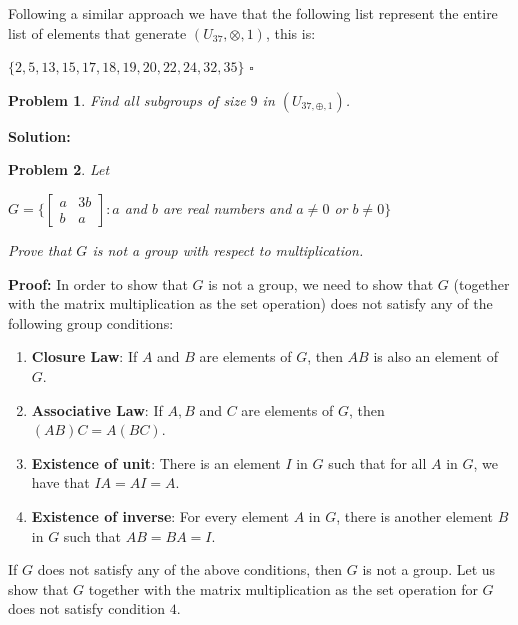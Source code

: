 \documentclass[a4paper,openany,11pt]{book}
\newtheorem{Prob}{Problem}
\begin{document}
Following a similar approach we have that the following list represent the entire list of elements that generate $(U_{37},\otimes, 1)$, this is:

\begin{center}
	$\lbrace 2, 5, 13, 15, 17, 18, 19, 20, 22, 24 , 32, 35 \rbrace$\hspace{0.1cm} $\square$
\end{center}

\begin{Prob}
	Find all subgroups of size $9$ in $(U_{37,\oplus,1})$.
\end{Prob}

\textbf{Solution:} 

\begin{Prob}
	Let
	
	\begin{center}
		$G = \biggl\{\left[\begin{array}{cc}
		a & 3b\\
		b & a
		\end{array}\right] : a$ and $b$ are real numbers and $a\neq 0$ or $b \neq 0\biggr\} $
	\end{center}

	Prove that $G$ is not a group with respect to multiplication.

\end{Prob}

\textbf{Proof:} In order to show that $G$ is not a group, we need to show that $G$ (together with the matrix multiplication as the set operation) does not satisfy any of the following group conditions:

\begin{enumerate}
	\item \textbf{Closure Law}: If $A$ and $B$ are elements of $G$, then $AB$ is also an element of $G$. 
	
	\item \textbf{Associative Law}: If $A, B$ and $C$ are elements of $G$, then $(AB)C = A(BC)$.
	
	\item \textbf{Existence of unit}: There is an element $I$ in $G$ such that for all $A$ in $G$, we have that $IA = AI = A$.
	
	\item \textbf{Existence of inverse}: For every element $A$ in $G$, there is another element $B$ in $G$ such that $AB = BA = I$.
\end{enumerate} 

If $G$ does not satisfy any of the above conditions, then $G$ is not a group. Let us show that $G$ together with the matrix multiplication as the set operation for $G$ does not satisfy condition $4$.\\
\end{document}
